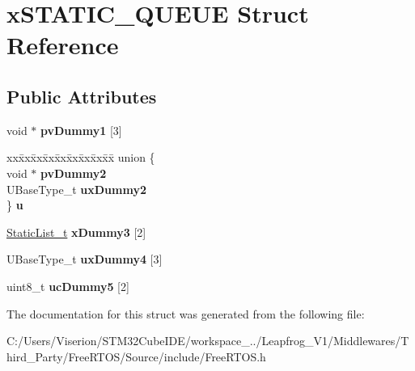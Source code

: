 \hypertarget{structx_s_t_a_t_i_c___q_u_e_u_e}{}\section{x\+S\+T\+A\+T\+I\+C\+\_\+\+Q\+U\+E\+UE Struct Reference}
\label{structx_s_t_a_t_i_c___q_u_e_u_e}
\subsection*{Public Attributes}
\begin{DoxyCompactItemize}
\item 
\mbox{\label{structx_s_t_a_t_i_c___q_u_e_u_e_aacf22a66a8d723648995692ec77ee416}} 
void $\ast$ {\bfseries pv\+Dummy1} \mbox{[}3\mbox{]}
\item 
\mbox{\label{structx_s_t_a_t_i_c___q_u_e_u_e_abd5871319dc992ce64f6737e17676c19}} 
\begin{tabbing}
xx\=xx\=xx\=xx\=xx\=xx\=xx\=xx\=xx\=\kill
union \{\\
\>void $\ast$ {\bfseries pvDummy2}\\
\>UBaseType\_t {\bfseries uxDummy2}\\
\} {\bfseries u}\\

\end{tabbing}\item 
\mbox{\label{structx_s_t_a_t_i_c___q_u_e_u_e_add0de93e08b632124122850bcd543597}} 
\mbox{\hyperlink{structx_s_t_a_t_i_c___l_i_s_t}{Static\+List\+\_\+t}} {\bfseries x\+Dummy3} \mbox{[}2\mbox{]}
\item 
\mbox{\label{structx_s_t_a_t_i_c___q_u_e_u_e_a502854697731754ce445f6503d14b127}} 
U\+Base\+Type\+\_\+t {\bfseries ux\+Dummy4} \mbox{[}3\mbox{]}
\item 
\mbox{\label{structx_s_t_a_t_i_c___q_u_e_u_e_a541c5044376603540cc3c9cabcbdc5e6}} 
uint8\+\_\+t {\bfseries uc\+Dummy5} \mbox{[}2\mbox{]}
\end{DoxyCompactItemize}


The documentation for this struct was generated from the following file\+:\begin{DoxyCompactItemize}
\item 
C\+:/\+Users/\+Viserion/\+S\+T\+M32\+Cube\+I\+D\+E/workspace\+\_../\+Leapfrog\+\_\+\+V1/\+Middlewares/\+Third\+\_\+\+Party/\+Free\+R\+T\+O\+S/\+Source/include/Free\+R\+T\+O\+S.\+h\end{DoxyCompactItemize}
